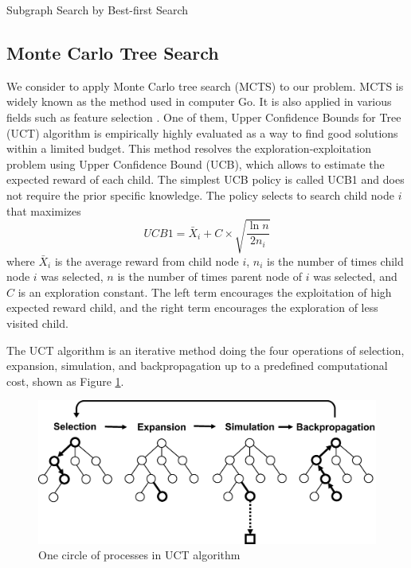 \begin{algorithm2e}[H]
  \caption{Subgraph Search by Best-first Search}
  \label{alg:bfs}
\end{algorithm2e}

\subsection{Monte Carlo Tree Search}
We consider to apply Monte Carlo tree search (MCTS) 
\cite{Levente:2006, Romaric:2010, Cameron:2012} to our problem. 
MCTS is widely known as the method used in computer Go. 
It is also applied in various fields such as feature selection \cite{Romaric:2010}. 
One of them, Upper Confidence Bounds for Tree (UCT) algorithm 
\cite{Levente:2006} is empirically highly evaluated as a way to find good solutions within a limited budget.
This method resolves the exploration-exploitation problem using Upper Confidence Bound (UCB),
which allows to estimate the expected reward of each child.
The simplest UCB policy is called UCB1 and does not require the prior specific knowledge.
The policy selects to search child node $i$ that maximizes
\begin{equation}
  \label{eq:ucb}
  UCB1 = \bar{X}_{i} + C \times \sqrt{\frac{\ln{n}}{2 n_{i}}}
\end{equation}
where $\bar{X}_{i}$ is the average reward from child node $i$, 
$n_{i}$ is the number of times child node $i$ was selected, 
$n$ is the number of times parent node of $i$ was selected,
and $C$ is an exploration constant.
The left term encourages the exploitation of high expected reward child,
and the right term encourages the exploration of less visited child.

The UCT algorithm is an iterative method 
doing the four operations of selection, expansion, 
simulation, and backpropagation up to a predefined computational cost, shown as Figure \ref{fig:MCTS}.
\begin{figure}[t]
  \centering
  \includegraphics[width=0.9\linewidth]{img/MCTS.eps}
  \caption{One circle of processes in UCT algorithm}
  \label{fig:MCTS}
\end{figure}


